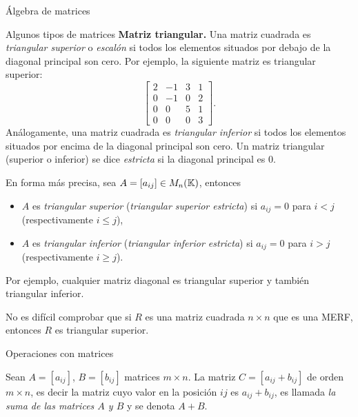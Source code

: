 \begin{chapter}{\'Algebra de matrices}
\begin{section}{Algunos tipos de matrices}
                \textbf{Matriz triangular.} Una matriz cuadrada es \textit{triangular superior} o \textit{escalón} si todos los elementos situados por debajo de la diagonal principal son cero. Por ejemplo, la siguiente matriz es triangular superior:
                \begin{equation}
                \begin{bmatrix}
                2&-1&3&1\\0&-1&0&2\\0&0&5&1\\0&0&0&3
                \end{bmatrix}.
                \end{equation}
                Análogamente, una matriz cuadrada es \textit{triangular inferior} si todos los elementos situados por encima de la diagonal principal son cero. Un matriz triangular (superior o inferior) se dice \textit{estricta} si la diagonal principal es $0$.
                
                En forma más precisa, sea $A =[a_{ij}]\in M_n(\mathbb K)$,  entonces
                \begin{itemize}
                    \item $A$ es \textit{triangular superior} (\textit{triangular superior estricta}) si $a_{ij} =0$ para $i < j$ (respectivamente $i \le j$),
                    \item $A$ es \textit{triangular inferior} (\textit{triangular inferior estricta}) si $a_{ij} =0$ para $i > j$ (respectivamente $i \ge j$).
                \end{itemize}
                
                Por  ejemplo, cualquier matriz diagonal es triangular superior y también triangular inferior. 
                
                No es difícil comprobar que si $R$ es una matriz cuadrada $n \times n$  que es una MERF,  entonces $R$  es triangular superior. 
            \end{section}
            
            \begin{section}{Operaciones con matrices}\label{seccion-operaciones-con-matrices}
                \begin{definicion} 
                    Sean $A=[a_{ij}]$, $B=[b_{ij}]$ matrices  $m \times n$. La matriz $C= [a_{ij} + b_{ij}]$ de orden $m \times n$,  es decir la matriz cuyo valor en la posición $ij$ es  $a_{ij} + b_{ij}$, es llamada \textit{la suma de las matrices $A$ y $B$} y se denota $A+B$.  
                \end{definicion}
                

\end{section}
\end{chapter}
